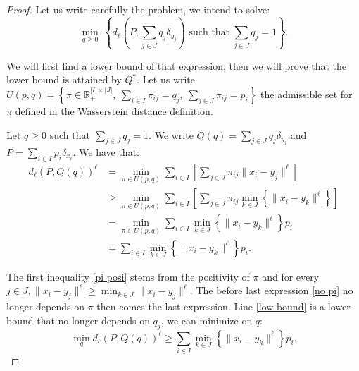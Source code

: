\documentclass{amsart}
\newcommand{\RR}{\mathbb{R}}
\begin{document}
\begin{proof}
Let us write carefully the problem, we intend to solve:
$$
    \min_{q\geq0}\:\left\{d_\ell\left(P,\sum_{j\in J}q_j\delta_{y_j}\right)\text{ such that} \;\sum_{j\in J}q_j=1 \right\}.
$$

We will first find a lower bound of that expression, then we will prove that the lower bound is attained by $Q^*$. Let us write $U\left(p,q\right)=\left\{\pi\in\RR^{\lvert I\rvert\times\lvert J\rvert}_+,\: \sum_{i\in I}\pi_{ij}=q_j,\:\sum_{j\in J}\pi_{ij}=p_i\right\}$ the admissible set for $\pi$ defined in the Wasserstein distance definition.
\newline
    
Let $q\geq 0$ such that $\sum_{j\in J}q_j=1$. We write $Q\left(q\right)=\sum_{j\in J}q_j\delta_{y_j}$ and $P=\sum_{i\in I}p_i\delta_{x_i}$. We have that:
\begin{align}
    d_\ell\left(P,Q\left(q\right)\right)^\ell&= \min_{\pi\in U\left(p,q\right)}\sum_{i\in I}\left[\sum_{j\in J}\pi_{ij}\lVert x_i-y_j\rVert^\ell\right] \nonumber \\
    &\geq \min_{\pi\in U\left(p,q\right)}\sum_{i\in I}\left[\sum_{j\in J}\pi_{ij}\min_{k\in J}\left\{\lVert x_i-y_k\lVert^\ell\right\}\right] \label{pi posi} \\ &= \min_{\pi\in U\left(p,q\right)}\sum_{i\in I}\min_{k\in J}\left\{\lVert x_i-y_k\lVert^\ell\right\}p_i \label{no pi}
    \\& =\sum_{i\in I}\min_{k\in J}\left\{\lVert x_i-y_k\lVert^\ell\right\}p_i. \label{low bound}
\end{align}
    
The first inequality \eqref{pi posi} stems from the positivity of $\pi$ and for every $j\in J, \lVert x_i-y_j\rVert^\ell \geq \min_{k\in J}\lVert x_i-y_j\rVert^\ell$. The before last expression \eqref{no pi} no longer depends on $\pi$ then comes the last expression. Line \ref{low bound} is a lower bound that no longer depends on $q_j$, we can minimize on $q$:
\begin{equation}\label{lower}\min_{q}d_\ell\left(P,Q\left(q\right)\right)^\ell\geq\sum_{i\in I}\min_{k\in J}\left\{\lVert x_i-y_k\lVert^\ell\right\}p_i.
\end{equation}


\end{proof}
\end{document}
